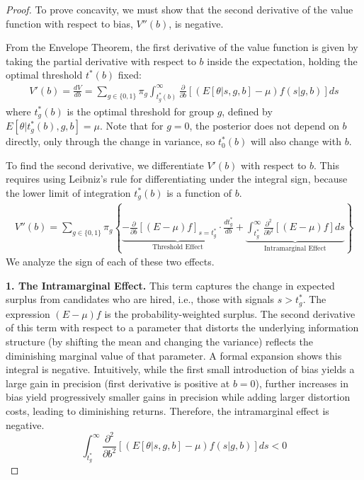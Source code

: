     \begin{proof}
    To prove concavity, we must show that the second derivative of the value function with respect to bias, $V''(b)$, is negative.
    
    From the Envelope Theorem, the first derivative of the value function is given by taking the partial derivative with respect to $b$ inside the expectation, holding the optimal threshold $t^*(b)$ fixed:
    \begin{align}
        V'(b) = \frac{dV}{db} = \sum_{g \in \{0,1\}} \pi_g \int_{t_g^*(b)}^\infty \frac{\partial}{\partial b} \left[ (E[\theta|s,g,b] - \mu) f(s|g,b) \right] ds
    \end{align}
    where $t_g^*(b)$ is the optimal threshold for group $g$, defined by $E[\theta|t_g^*(b),g,b] = \mu$. Note that for $g=0$, the posterior does not depend on $b$ directly, only through the change in variance, so $t_0^*(b)$ will also change with $b$.
    
    To find the second derivative, we differentiate $V'(b)$ with respect to $b$. This requires using Leibniz's rule for differentiating under the integral sign, because the lower limit of integration $t_g^*(b)$ is a function of $b$.
    \begin{align}
        V''(b) = \sum_{g \in \{0,1\}} \pi_g \left\{ \underbrace{-\frac{\partial}{\partial b} \left[ (E - \mu) f \right]_{s=t_g^*} \cdot \frac{dt_g^*}{db}}_{\text{Threshold Effect}} + \underbrace{\int_{t_g^*}^\infty \frac{\partial^2}{\partial b^2}\left[ (E - \mu) f \right] ds}_{\text{Intramarginal Effect}} \right\}
    \end{align}
    We analyze the sign of each of these two effects.
    
    \textbf{1. The Intramarginal Effect.}
    This term captures the change in expected surplus from candidates who are hired, i.e., those with signals $s > t_g^*$. The expression $(E-\mu)f$ is the probability-weighted surplus. The second derivative of this term with respect to a parameter that distorts the underlying information structure (by shifting the mean and changing the variance) reflects the diminishing marginal value of that parameter. A formal expansion shows this integral is negative. Intuitively, while the first small introduction of bias yields a large gain in precision (first derivative is positive at $b=0$), further increases in bias yield progressively smaller gains in precision while adding larger distortion costs, leading to diminishing returns. Therefore, the intramarginal effect is negative.
    $$ \int_{t_g^*}^\infty \frac{\partial^2}{\partial b^2}\left[ (E[\theta|s,g,b] - \mu) f(s|g,b) \right] ds < 0 $$
    

\end{proof}
